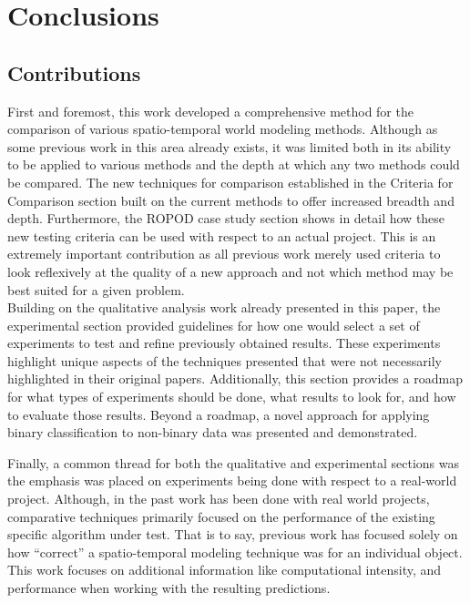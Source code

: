 

    \chapter{Conclusions}

    \section{Contributions}

    First and foremost, this work developed a comprehensive method for the
    comparison of various spatio-temporal world modeling methods. Although as
    some previous work in this area
    already exists, it was limited both in its ability to be applied to various
    methods and the depth at which any two methods could be compared. The
    new techniques for comparison established in the Criteria for Comparison
    section built on the current methods to offer increased breadth and depth.
    Furthermore, the ROPOD case study section shows in detail how these new testing criteria
    can be used with respect to an actual project. This is an extremely important
    contribution as all previous work merely used criteria to look reflexively
    at the quality of a new approach and not which method may be
    best suited for a given problem. \\

    Building on the qualitative analysis work already presented in this
    paper, the experimental section provided guidelines for how one would select
    a set of experiments to test and refine previously obtained results.
    These experiments highlight unique aspects of the techniques presented that
    were not necessarily highlighted in their original papers.
    Additionally, this section provides a roadmap for what types of experiments
    should be done, what results to look for, and how to evaluate those results.
    Beyond a roadmap, a novel approach for applying binary classification to
    non-binary data was presented and demonstrated.

    Finally, a common thread for both the qualitative and experimental
    sections was the emphasis was placed on experiments being done with respect to a
    real-world project. Although, in the past work has been done with real
    world projects, comparative techniques primarily focused on
    the performance of the existing specific algorithm under test. That is to say, previous work has
    focused solely on how ``correct'' a spatio-temporal modeling technique was
    for an individual object. This work focuses on additional information like
    computational intensity, and performance when working with the
    resulting predictions. \\

